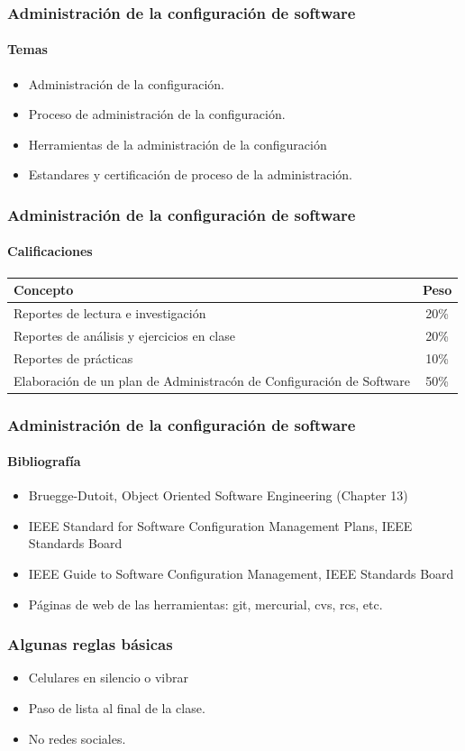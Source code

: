 \begin{frame}
\frametitle{Administraci\'on de la configuraci\'on de software}
\framesubtitle{Temas}

\begin{itemize}
  \item Administraci\'on de la configuraci\'on. 
  \item Proceso de administraci\'on de la configuraci\'on.
  \item Herramientas de la administraci\'on de la configuraci\'on
  \item Estandares y certificaci\'on de proceso de la administraci\'on.
\end{itemize}

\end{frame}
\begin{frame}[fragile]
\frametitle{Administraci\'on de la configuraci\'on de software}
\framesubtitle{Calificaciones}
\begin{tabular}{|p{8cm} |c|}
\hline
Concepto & Peso \\
\hline
Reportes de lectura e investigaci\'on & 20\% \\
Reportes de an\'alisis y ejercicios en clase & 20\% \\
Reportes de pr\'acticas &  10\% \\
Elaboraci\'on de un plan de Administrac\'on de Configuraci\'on de Software &
50\% \\
\hline
\end{tabular}
\end{frame}

\begin{frame}
\frametitle{Administraci\'on de la configuraci\'on de software}
\framesubtitle{Bibliograf\'ia}
\begin{itemize}
  \item Bruegge-Dutoit, Object Oriented Software Engineering (Chapter 13)
  \item IEEE Standard for Software Configuration Management Plans, IEEE Standards 
Board
  \item IEEE Guide to Software Configuration Management, IEEE Standards Board 
  \item P\'aginas de web de las herramientas: git, mercurial, cvs, rcs, etc. 
\end{itemize}

\end{frame}
\begin{frame}
\frametitle{Algunas reglas b\'asicas}
\begin{itemize}
  \item Celulares en silencio o vibrar
  \item Paso de lista al final de la clase. 
  \item No redes sociales. 
\end{itemize}
\end{frame}
